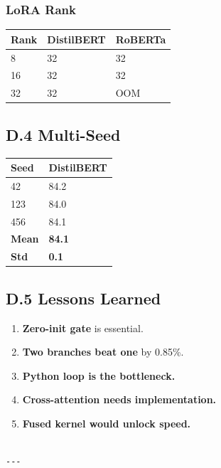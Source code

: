 \subsubsection{LoRA Rank}

\begin{table}[H]
\centering
\small
\begin{tabular}{lll}
\toprule
\textbf{Rank} & \textbf{DistilBERT} & \textbf{RoBERTa} \\
\midrule
8 & 32 & 32 \\
16 & 32 & 32 \\
32 & 32 & OOM \\
\bottomrule
\end{tabular}
\end{table}

\subsection{D.4 Multi-Seed}

\begin{table}[H]
\centering
\small
\begin{tabular}{ll}
\toprule
\textbf{Seed} & \textbf{DistilBERT} \\
\midrule
42 & 84.2 \\
123 & 84.0 \\
456 & 84.1 \\
\textbf{Mean} & \textbf{84.1} \\
\textbf{Std} & \textbf{0.1} \\
\bottomrule
\end{tabular}
\end{table}

\subsection{D.5 Lessons Learned}

\begin{enumerate}
\item \textbf{Zero-init gate} is essential.
\item \textbf{Two branches beat one} by 0.85\%.
\item \textbf{Python loop is the bottleneck.}
\item \textbf{Cross-attention needs implementation.}
\item \textbf{Fused kernel would unlock speed.}
\end{enumerate}
\begin{lstlisting}

---
\end{lstlisting}

